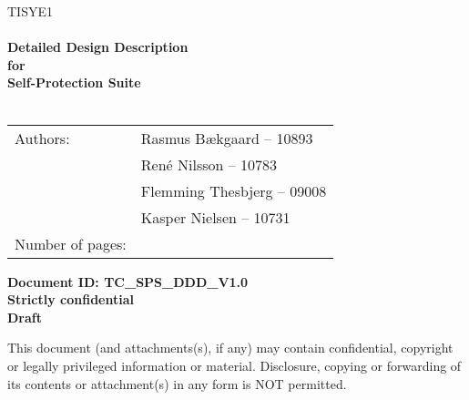 \documentclass[Main]{subfiles}
\begin{document}
\begin{center}

\textsc{\Large TISYE1}\\[0.5cm]


\HRule \\[0.4cm]

{ \huge \bfseries Detailed Design Description}\\[0.4cm]
{ \huge \bfseries for}\\[0.4cm] 
{ \huge \bfseries Self-Protection Suite}\\[0.4cm]

\HRule \\[1.5cm]

\begin{tabular}{p{}|p{}}
\hline 
Authors: & Rasmus Bækgaard -- 10893\\ & René Nilsson -- 10783\\ &Flemming Thesbjerg -- 09008\\ &Kasper Nielsen -- 10731\\ 
\hline 
Number of pages: & \pageref{LastPage} \\
\hline 
\end{tabular} 

\textbf{\Large Document ID: TC\_SPS\_DDD\_V1.0}\\
\textbf{\Large Strictly confidential}\\
\textbf{\Large Draft}

This document (and attachments(s), if any) may contain confidential, copyright or legally privileged information or material.
Disclosure, copying or forwarding of its contents or attachment(s) in any form is NOT permitted.
\end{center}
\end{document}
